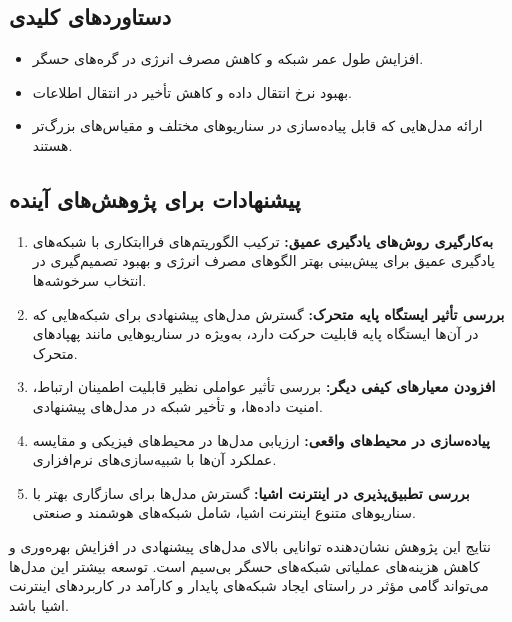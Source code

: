 \documentclass[12pt, onecolumn, a4paper]{article}
\begin{document}
\subsection*{دستاوردهای کلیدی}
\begin{itemize}
	\item افزایش طول عمر شبکه و کاهش مصرف انرژی در گره‌های حسگر.
	\item بهبود نرخ انتقال داده و کاهش تأخیر در انتقال اطلاعات.
	\item ارائه مدل‌هایی که قابل پیاده‌سازی در سناریوهای مختلف و مقیاس‌های بزرگ‌تر هستند.
\end{itemize}

\subsection*{پیشنهادات برای پژوهش‌های آینده}
\begin{enumerate}
	\item \textbf{به‌کارگیری روش‌های یادگیری عمیق:} ترکیب الگوریتم‌های فراابتکاری با شبکه‌های یادگیری عمیق برای پیش‌بینی بهتر الگوهای مصرف انرژی و بهبود تصمیم‌گیری در انتخاب سرخوشه‌ها.
	\item \textbf{بررسی تأثیر ایستگاه پایه متحرک:} گسترش مدل‌های پیشنهادی برای شبکه‌هایی که در آن‌ها ایستگاه پایه قابلیت حرکت دارد، به‌ویژه در سناریوهایی مانند پهپادهای متحرک.
	\item \textbf{افزودن معیارهای کیفی دیگر:} بررسی تأثیر عواملی نظیر قابلیت اطمینان ارتباط، امنیت داده‌ها، و تأخیر شبکه در مدل‌های پیشنهادی.
	\item\textbf{پیاده‌سازی در محیط‌های واقعی:} ارزیابی مدل‌ها در محیط‌های فیزیکی و مقایسه عملکرد آن‌ها با شبیه‌سازی‌های نرم‌افزاری.
	\item \textbf{بررسی تطبیق‌پذیری در اینترنت اشیا:} گسترش مدل‌ها برای سازگاری بهتر با سناریوهای متنوع اینترنت اشیا، شامل شبکه‌های هوشمند و صنعتی.
\end{enumerate}

نتایج این پژوهش نشان‌دهنده توانایی بالای مدل‌های پیشنهادی در افزایش بهره‌وری و کاهش هزینه‌های عملیاتی شبکه‌های حسگر بی‌سیم است. توسعه بیشتر این مدل‌ها می‌تواند گامی مؤثر در راستای ایجاد شبکه‌های پایدار و کارآمد در کاربردهای اینترنت اشیا باشد.
\newpage
\renewcommand{\bibname}{مراجع} %
\end{document}
